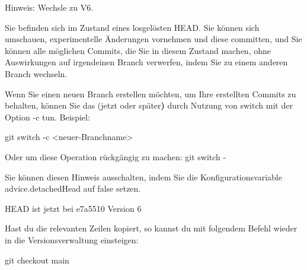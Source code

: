 \documentclass[
  ngerman,
  letterpaper,
  DIV=11]{scrreprt}
\newenvironment{Shaded}{\begin{snugshade}}{\end{snugshade}}
\newcommand{\AttributeTok}[1]{\textcolor[rgb]{0.40,0.45,0.13}{#1}}
\newcommand{\ErrorTok}[1]{\textcolor[rgb]{0.68,0.00,0.00}{#1}}
\newcommand{\ExtensionTok}[1]{\textcolor[rgb]{0.00,0.23,0.31}{#1}}
\newcommand{\FunctionTok}[1]{\textcolor[rgb]{0.28,0.35,0.67}{#1}}
\newcommand{\KeywordTok}[1]{\textcolor[rgb]{0.00,0.23,0.31}{\textbf{#1}}}
\newcommand{\NormalTok}[1]{\textcolor[rgb]{0.00,0.23,0.31}{#1}}
\newcommand{\OperatorTok}[1]{\textcolor[rgb]{0.37,0.37,0.37}{#1}}
\newcommand{\StringTok}[1]{\textcolor[rgb]{0.13,0.47,0.30}{#1}}
\begin{document}
\begin{Shaded}
\begin{Highlighting}[]
\ExtensionTok{Hinweis:}\NormalTok{ Wechsle zu }\StringTok{\textquotesingle{}V6\textquotesingle{}}\NormalTok{.}

\ExtensionTok{Sie}\NormalTok{ befinden sich im Zustand eines }\StringTok{\textquotesingle{}losgelösten HEAD\textquotesingle{}}\NormalTok{. }
\ExtensionTok{Sie}\NormalTok{ können sich umschauen, experimentelle Änderungen }
\ExtensionTok{vornehmen}\NormalTok{ und diese committen, und Sie können alle möglichen }
\ExtensionTok{Commits,}\NormalTok{ die Sie in diesem Zustand machen, ohne Auswirkungen }
\ExtensionTok{auf}\NormalTok{ irgendeinen Branch verwerfen, indem Sie zu einem}
\ExtensionTok{anderen}\NormalTok{ Branch wechseln.}

\ExtensionTok{Wenn}\NormalTok{ Sie einen neuen Branch erstellen möchten, um Ihre }
\ExtensionTok{erstellten}\NormalTok{ Commits zu behalten, können Sie das }\ErrorTok{(}\ExtensionTok{jetzt} 
\ExtensionTok{oder}\NormalTok{ später}\KeywordTok{)} \ExtensionTok{durch}\NormalTok{ Nutzung von }\StringTok{\textquotesingle{}switch\textquotesingle{}}\NormalTok{ mit der Option }\AttributeTok{{-}c} 
\ExtensionTok{tun.}\NormalTok{ Beispiel:}

  \FunctionTok{git}\NormalTok{ switch }\AttributeTok{{-}c} \OperatorTok{\textless{}}\NormalTok{neuer{-}Branchname}\OperatorTok{\textgreater{}}

\ExtensionTok{Oder}\NormalTok{ um diese Operation rückgängig zu machen:}
  \FunctionTok{git}\NormalTok{ switch }\AttributeTok{{-}}

\ExtensionTok{Sie}\NormalTok{ können diesen Hinweis ausschalten, indem Sie die }
\ExtensionTok{Konfigurationsvariable} \StringTok{\textquotesingle{}advice.detachedHead\textquotesingle{}}\NormalTok{ auf }\StringTok{\textquotesingle{}false\textquotesingle{}} 
\ExtensionTok{setzen.}

\ExtensionTok{HEAD}\NormalTok{ ist jetzt bei e7a5510 Version 6}
\end{Highlighting}
\end{Shaded}

Hast du die relevanten Zeilen kopiert, so kannst du mit folgendem Befehl
wieder in die Versionsverwaltung einsteigen:

\begin{Shaded}
\begin{Highlighting}[]
\FunctionTok{git}\NormalTok{ checkout main }
\end{Highlighting}
\end{Shaded}
\end{document}
